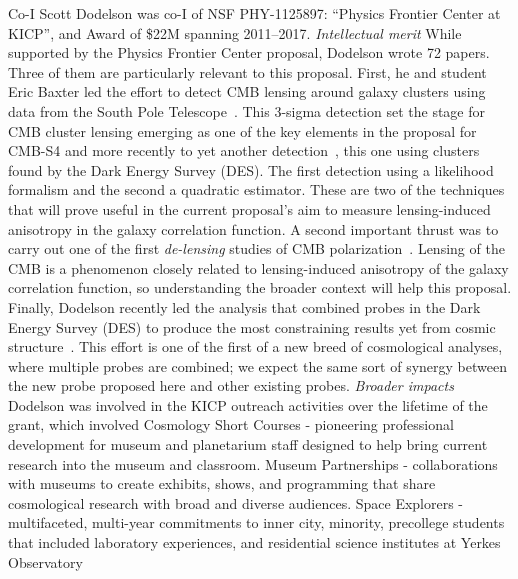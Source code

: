 \documentclass[12pt]{article}
\begin{document}
\begin{small}
Co-I Scott Dodelson was co-I of NSF PHY-1125897: ``Physics Frontier Center at KICP'', and Award of \$22M spanning 2011--2017.
{\it Intellectual merit}
While supported by the Physics Frontier Center proposal, Dodelson
wrote 72 papers. Three of them are particularly relevant to this
proposal. First, he and student Eric Baxter led the effort to detect
CMB lensing around galaxy clusters using data from the South Pole
Telescope~\cite{Baxter:2014frs}. This 3-sigma detection set the stage
for CMB cluster lensing emerging as one of the key elements in the
proposal for CMB-S4 and more recently to yet another detection~\cite{Baxter:2017ixz}, this one using clusters found by the Dark Energy
Survey (DES).  The first detection using a likelihood formalism and
the second a quadratic estimator. These are two of the techniques
that will prove useful in the current proposal's aim to measure
lensing-induced anisotropy in the galaxy correlation function.
A second important thrust was to carry out one of the first 
{\it  de-lensing} studies of CMB
polarization~\cite{Manzotti:2017net}. Lensing of the CMB is a 
phenomenon closely related to lensing-induced anisotropy of the galaxy
correlation function, so understanding the broader context will help
this proposal. 
Finally, Dodelson recently led the analysis that combined probes in
the Dark Energy Survey (DES) to produce the most constraining results
yet from cosmic structure~\cite{Abbott:2017wau}. This effort is one
of the first of a new breed of cosmological analyses, where multiple
probes are combined; we expect the same sort of synergy between the
new probe proposed here and other existing probes.
{\it Broader impacts} Dodelson was involved in the KICP outreach
activities over the lifetime of the grant, which involved     
Cosmology Short Courses - pioneering professional development for museum 
and planetarium staff designed to help bring current research into the 
museum and classroom.
 Museum Partnerships - collaborations with museums to create 
exhibits, shows, and programming that share cosmological research with 
broad and diverse audiences.
 Space Explorers - multifaceted, multi-year commitments
to inner city, minority, precollege students that included
 laboratory experiences, 
and residential science institutes at Yerkes Observatory




\end{small}

\newpage



\end{document}

